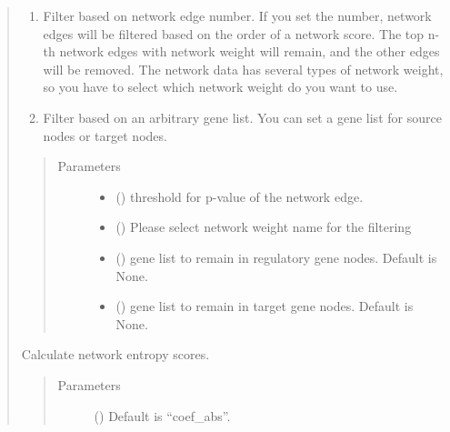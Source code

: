 \documentclass[letterpaper,10pt,english]{sphinxmanual}
\begin{document}
\begin{quote}
\begin{fulllineitems}
\begin{fulllineitems}
\begin{enumerate}
\item {} 
Filter based on network edge number.
If you set the number, network edges will be filtered based on the order of a network score. The top n-th network edges with network weight will remain, and the other edges will be removed.
The network data has several types of network weight, so you have to select which network weight do you want to use.

\item {} 
Filter based on an arbitrary gene list. You can set a gene list for source nodes or target nodes.

\end{enumerate}
\begin{quote}\begin{description}
\item[{Parameters}] \leavevmode\begin{itemize}
\item {} 
 () \textendash{} threshold for p-value of the network edge.

\item {} 
 () \textendash{} Please select network weight name for the filtering

\item {} 
 () \textendash{} gene list to remain in regulatory gene nodes. Default is None.

\item {} 
 () \textendash{} gene list to remain in target gene nodes. Default is None.

\end{itemize}

\end{description}\end{quote}

\end{fulllineitems}


\begin{fulllineitems}
\label{\detokenize{modules/celloracle.network_analysis:celloracle.network_analysis.Links.get_network_entropy}}
Calculate network entropy scores.
\begin{quote}\begin{description}
\item[{Parameters}] \leavevmode
{} () \textendash{} Default is “coef\_abs”.


\end{description}
\end{quote}
\end{fulllineitems}
\end{fulllineitems}
\end{quote}
\end{document}
